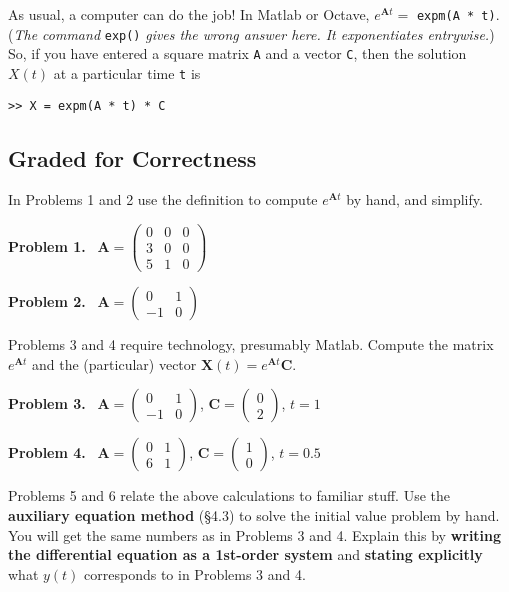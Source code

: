\documentclass[12pt]{article}
\theoremstyle{definition}
\newcommand{\bA}{\mathbf{A}}
\newcommand{\bC}{\mathbf{C}}
\newcommand{\bX}{\mathbf{X}}
\newcommand{\exer}[1]{\noindent \textbf{Problem #1.} \,}
\newcommand{\ds}{\displaystyle}
\begin{document}
As usual, a computer can do the job!  In Matlab or Octave, $e^{\bA t}=$ \verb|expm(A * t)|.  (\emph{The command} \texttt{exp()} \emph{gives the wrong answer here.  It exponentiates entrywise.})  So, if you have entered a square matrix \texttt{A} and a vector \texttt{C}, then the solution $X(t)$ at a particular time \texttt{t} is
\begin{Verbatim}
>> X = expm(A * t) * C
\end{Verbatim}


\clearpage\newpage
\normalsize
\subsection*{Graded for Correctness}

In Problems 1 and 2 use the definition to compute $e^{\bA t}$ by hand, and simplify.

\exer{1}  $\ds \bA = \begin{pmatrix} 0 & 0 & 0 \\ 3 & 0 & 0 \\ 5 & 1 & 0 \end{pmatrix}$

\exer{2}  $\ds \bA = \begin{pmatrix} 0 & 1 \\ -1 & 0 \end{pmatrix}$

\medskip
Problems 3 and 4 require technology, presumably Matlab.  Compute the matrix $e^{\bA t}$ and the (particular) vector $\bX(t) = e^{\bA t} \bC$.

\exer{3}  $\ds \bA = \begin{pmatrix} 0 & 1 \\ -1 & 0 \end{pmatrix}$, $\ds \bC = \begin{pmatrix} 0 \\ 2 \end{pmatrix}$, $t=1$

\exer{4}  $\ds \bA = \begin{pmatrix} 0 & 1 \\ 6 & 1 \end{pmatrix}$, $\ds \bC = \begin{pmatrix} 1 \\0 \end{pmatrix}$, $t=0.5$

\medskip
Problems 5 and 6 relate the above calculations to familiar stuff.  Use the \textbf{auxiliary equation method} (\S4.3) to solve the initial value problem by hand.  You will get the same numbers as in Problems 3 and 4.  Explain this by \textbf{writing the differential equation as a 1st-order system} and \textbf{stating explicitly} what $y(t)$ corresponds to in Problems 3 and 4.
\end{document}
